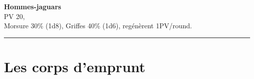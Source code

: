 \documentclass[11pt,twoside,a4paper]{book}
\begin{document}
\textbf{Hommes-jaguars}~\\
PV 20,~\\
Morsure 30\% (1d8), Griffes 40\% (1d6), reg{\'e}n{\`e}rent 1PV/round.~\\

\begin{center} \rule{10cm}{0.1cm} \end{center}

\clearpage

\section*{Les corps d'emprunt}
\end{document}
